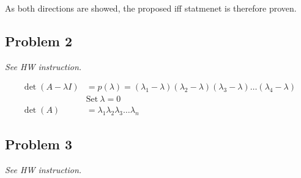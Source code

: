 \documentclass[11pt]{article}
\begin{document}
\noindent As both directions are showed, the proposed iff statmenet is therefore proven.

\subsection*{Problem 2}
\textit{See HW instruction.}\newline

\begin{align*}
    \det(A - \lambda I) &= p(\lambda) = (\lambda_1 - \lambda)(\lambda_2 - \lambda)(\lambda_3 - \lambda) \dots (\lambda_4 - \lambda) \\
    &\text{Set} \ \lambda = 0 \\
    \det(A) &= \lambda_1 \lambda_2 \lambda_3 \dots \lambda_n
\end{align*}


\subsection*{Problem 3}
\textit{See HW instruction.}\newline
\end{document}
